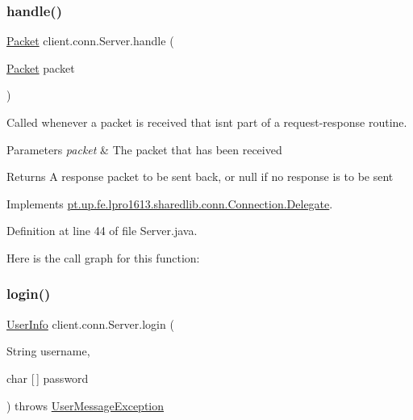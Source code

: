 \subsubsection{\texorpdfstring{handle()}{handle()}}
{\footnotesize\ttfamily \hyperlink{classpt_1_1up_1_1fe_1_1lpro1613_1_1sharedlib_1_1conn_1_1_packet}{Packet} client.\+conn.\+Server.\+handle (\begin{DoxyParamCaption}\item[{\hyperlink{classpt_1_1up_1_1fe_1_1lpro1613_1_1sharedlib_1_1conn_1_1_packet}{Packet}}]{packet }\end{DoxyParamCaption})}

Called whenever a packet is received that isn\textquotesingle{}t part of a request-\/response routine.


\begin{DoxyParams}{Parameters}
{\em packet} & The packet that has been received \\
\hline
\end{DoxyParams}
\begin{DoxyReturn}{Returns}
A response packet to be sent back, or null if no response is to be sent 
\end{DoxyReturn}


Implements \hyperlink{interfacept_1_1up_1_1fe_1_1lpro1613_1_1sharedlib_1_1conn_1_1_connection_1_1_delegate_a5b0f77e34d93967ae53cf7e01f0e2835}{pt.\+up.\+fe.\+lpro1613.\+sharedlib.\+conn.\+Connection.\+Delegate}.



Definition at line 44 of file Server.\+java.

Here is the call graph for this function\+:
\hypertarget{classclient_1_1conn_1_1_server_a064556a987ee40eb0a91a952ae08969f}{}\label{classclient_1_1conn_1_1_server_a064556a987ee40eb0a91a952ae08969f} 
\subsubsection{\texorpdfstring{login()}{login()}}
{\footnotesize\ttfamily \hyperlink{classpt_1_1up_1_1fe_1_1lpro1613_1_1sharedlib_1_1tuples_1_1_user_info}{User\+Info} client.\+conn.\+Server.\+login (\begin{DoxyParamCaption}\item[{String}]{username,  }\item[{char \mbox{[}$\,$\mbox{]}}]{password }\end{DoxyParamCaption}) throws \hyperlink{classpt_1_1up_1_1fe_1_1lpro1613_1_1sharedlib_1_1exceptions_1_1_user_message_exception}{User\+Message\+Exception}}

